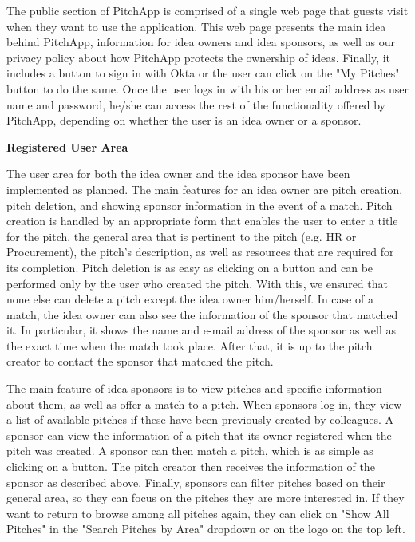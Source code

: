 The public section of PitchApp is comprised of a single web page that guests visit when they want to use the application. This web page presents the main idea behind PitchApp, information for idea owners and idea sponsors, as well as our privacy policy about how PitchApp protects the ownership of ideas. Finally, it includes a button to sign in with Okta or the user can click on the "My Pitches" button to do the same. Once the user logs in with his or her email address as user name and password, he/she can access the rest of the functionality offered by PitchApp, depending on whether the user is an idea owner or a sponsor.

\textbf{Registered User Area}

The user area for both the idea owner and the idea sponsor have been implemented as planned. The main features for an idea owner are pitch creation, pitch deletion, and showing sponsor information in the event of a match.
Pitch creation is handled by an appropriate form that enables the user to enter a title for the pitch, the general area that is pertinent to the pitch (e.g. HR or Procurement), the pitch’s description, as well as resources that are required for its completion.
Pitch deletion is as easy as clicking on a button and can be performed only by the user who created the pitch. With this, we ensured that none else can delete a pitch except the idea owner him/herself.
In case of a match, the idea owner can also see the information of the sponsor that matched it. In particular, it shows the name and e-mail address of the sponsor as well as the exact time when the match took place. After that, it is up to the pitch creator to contact the sponsor that matched the pitch.

The main feature of idea sponsors is to view pitches and specific information about them, as well as offer a match to a pitch. When sponsors log in, they view a list of available pitches if these have been previously created by colleagues.
A sponsor can view the information of a pitch that its owner registered when the pitch was created. A sponsor can then match a pitch, which is as simple as clicking on a button. The pitch creator then receives the information of the sponsor as described above.
Finally, sponsors can filter pitches based on their general area, so they can focus on the pitches they are more interested in. If they want to return to browse among all pitches again, they can click on "Show All Pitches" in the "Search Pitches by Area" dropdown or on the logo on the top left.

